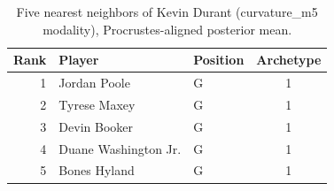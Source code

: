 \begin{table}[htbp]
  \centering\small
  \begin{tabular}{rllc}
    \toprule
    Rank & Player & Position & Archetype \\
    \midrule
    1 & Jordan Poole & G & 1 \\
    2 & Tyrese Maxey & G & 1 \\
    3 & Devin Booker & G & 1 \\
    4 & Duane Washington Jr. & G & 1 \\
    5 & Bones Hyland & G & 1 \\
    \bottomrule
  \end{tabular}
  \caption{Five nearest neighbors of Kevin Durant (curvature_m5 modality), Procrustes-aligned posterior mean.}
  \label{tab:Kevin_Durant_neighbors_curvature_m5}
\end{table}

